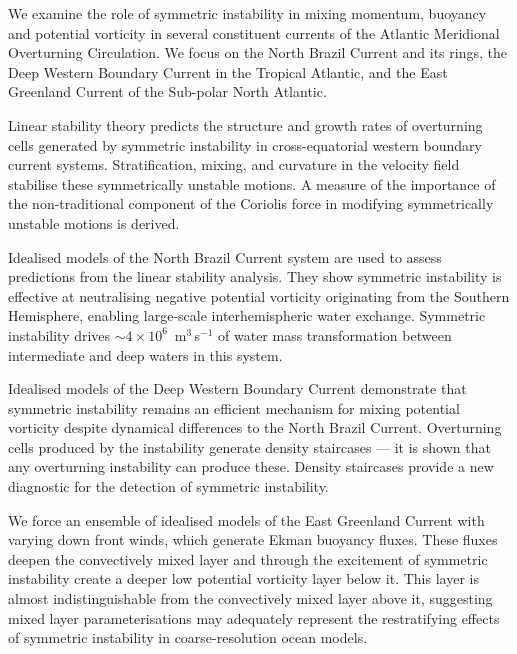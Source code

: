 \cleardoublepage
{}
{}
\begin{abstractlong}
    \begin{spacing}{1.25}
    We examine the role of symmetric instability in mixing momentum, buoyancy and potential vorticity in several constituent currents of the Atlantic Meridional Overturning Circulation. We focus on the North Brazil Current and its rings, the Deep Western Boundary Current in the Tropical Atlantic, and the East Greenland Current of the Sub-polar North Atlantic.

    Linear stability theory predicts the structure and growth rates of overturning cells generated by symmetric instability in cross-equatorial western boundary current systems. Stratification, mixing, and curvature in the velocity field stabilise these symmetrically unstable motions. A measure of the importance of the non-traditional component of the Coriolis force in modifying symmetrically unstable motions is derived.

    Idealised models of the North Brazil Current system are used to assess predictions from the linear stability analysis. They show symmetric instability is effective at neutralising negative potential vorticity originating from the Southern Hemisphere, enabling large-scale interhemispheric water exchange. Symmetric instability drives $\sim 4 \times 10^6$~m$^3$\,s$^{-1}$ of water mass transformation between intermediate and deep waters in this system.

    Idealised models of the Deep Western Boundary Current demonstrate that symmetric instability remains an efficient mechanism for mixing potential vorticity despite dynamical differences to the North Brazil Current. Overturning cells produced by the instability generate density staircases --- it is shown that any overturning instability can produce these. Density staircases provide a new diagnostic for the detection of symmetric instability.

    We force an ensemble of idealised models of the East Greenland Current with varying down front winds, which generate Ekman buoyancy fluxes. These fluxes deepen the convectively mixed layer and through the excitement of symmetric instability create a deeper low potential vorticity layer below it. This layer is almost indistinguishable from the convectively mixed layer above it, suggesting mixed layer parameterisations may adequately represent the restratifying effects of symmetric instability in coarse-resolution ocean models.
    \end{spacing}

\end{abstractlong}